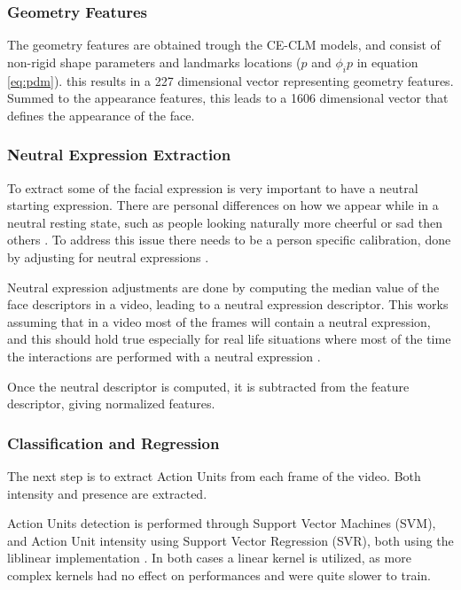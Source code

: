 \subsubsection{Geometry Features}
The geometry features are obtained trough the CE-CLM models, and consist of non-rigid shape parameters and landmarks locations ($p$ and $ \phi_i p$ in equation \ref{eq:pdm}). this results in a 227 dimensional vector representing geometry features.\\
Summed to the appearance features, this leads to a 1606 dimensional vector that defines the appearance of the face.

\subsubsection{Neutral Expression Extraction}
To extract some of the facial expression is very important to have a neutral starting expression. There are personal differences on how we appear while in a neutral resting state, such as people looking naturally more cheerful or sad then others \cite{normexpr}. To address this issue there needs to be a person specific calibration, done by adjusting for neutral expressions \cite{Baltru2013}.

Neutral expression adjustments are done by computing the median value of the face descriptors in a video, leading to a neutral expression descriptor. This works assuming that in a video most of the frames will contain a neutral expression, and this should hold true especially for real life situations where most of the time the interactions are performed with a neutral expression \cite{NatAffData}.

Once the neutral descriptor is computed, it is subtracted from the feature descriptor, giving normalized features. 

\subsubsection{Classification and Regression}
The next step is to extract Action Units from each frame of the video. Both intensity and presence are extracted.

Action Units detection is performed through Support Vector Machines (SVM), and Action Unit intensity using Support Vector Regression (SVR), both using the liblinear implementation \cite{liblinear}. In both cases a linear kernel is utilized, as more complex kernels had no effect on performances and were quite slower to train.  

